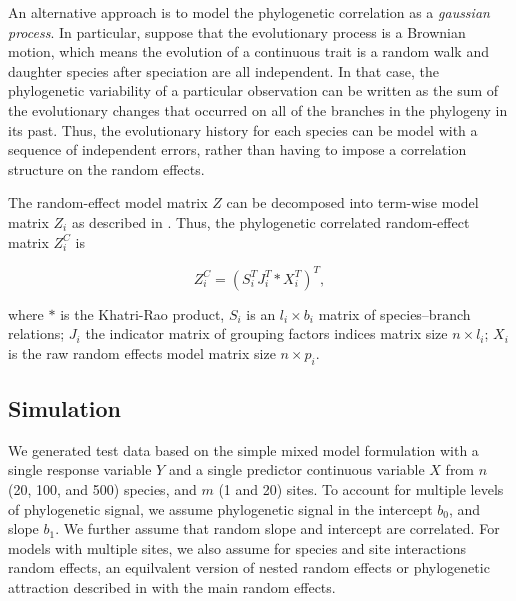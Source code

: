 An alternative approach is to model the phylogenetic correlation as a \textit{gaussian process}. 
In particular, suppose that the evolutionary process is a Brownian motion, which means the evolution of a continuous trait is a random walk and daughter species after speciation are all independent.  
In that case, the phylogenetic variability of a particular observation can be written as the sum of the evolutionary changes that occurred on all of the branches in the phylogeny in its past. 
Thus, the evolutionary history for each species can be model with a sequence of independent errors, rather than having to impose a correlation structure on the random effects. 

The random-effect model matrix $Z$ can be decomposed into term-wise model matrix $Z_{i}$ as described in .
Thus, the phylogenetic correlated random-effect matrix $Z^{C}_{i}$ is

\begin{equation}
Z^{C}_{i} = (S^{T}_{i}J^{T}_{i} \ast X^{T}_{i})^{T},
\end{equation}


where $\ast$ is the Khatri-Rao product, $S_{i}$ is an $l_{i} \times b_{i}$ matrix of species--branch relations; $J_{i}$ the indicator matrix of grouping factors indices matrix size $n \times l_{i}$; $X_{i}$ is the raw random effects model matrix size $n \times p_{i}$.



\subsection{Simulation}

We generated test data based on the simple mixed model formulation  with a single response variable $Y$ and a single predictor continuous variable $X$ from $n$ (20, 100, and 500) species, and $m$ (1 and 20) sites. 
To account for multiple levels of phylogenetic signal, we assume phylogenetic signal in the intercept $b_0$, and slope $b_1$.
We further assume that random slope and intercept are correlated. 
For models with multiple sites, we also assume for species and site interactions random effects, an equilvalent version of nested random effects or phylogenetic attraction described in \cite{helmus2007separating} with the main random effects.

